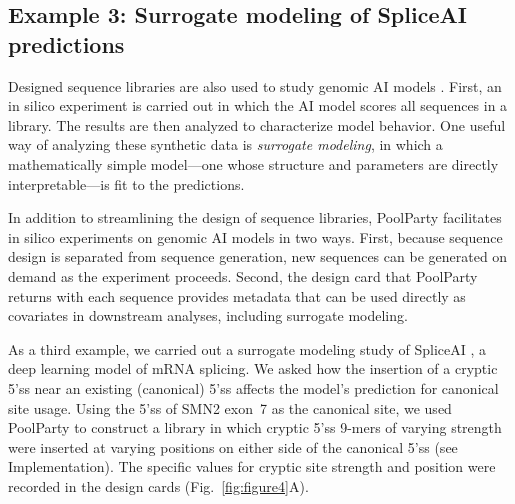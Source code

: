 \documentclass[pdflatex,sn-vancouver-num,referee,lineno,oneside]{sn-jnl}
\begin{document}
\subsection{Example 3: Surrogate modeling of SpliceAI predictions}\label{subsec:example3-spliceai}

Designed sequence libraries are also used to study genomic AI models \citep{Avsec2021bpnet, Toneyan2024creme, Seitz2024squid, Nagai2026review}. First, an in silico experiment is carried out in which the AI model scores all sequences in a library. The results are then analyzed to characterize model behavior. One useful way of analyzing these synthetic data is \emph{surrogate modeling}, in which a mathematically simple model---one whose structure and parameters are directly interpretable---is fit to the predictions.

In addition to streamlining the design of sequence libraries, PoolParty facilitates in silico experiments on genomic AI models in two ways. First, because sequence design is separated from sequence generation, new sequences can be generated on demand as the experiment proceeds. Second, the design card that PoolParty returns with each sequence provides metadata that can be used directly as covariates in downstream analyses, including surrogate modeling.

As a third example, we carried out a surrogate modeling study of SpliceAI \citep{Jaganathan2019ps}, a deep learning model of mRNA splicing. We asked how the insertion of a cryptic 5'ss near an existing (canonical) 5'ss affects the model's prediction for canonical site usage. Using the 5'ss of SMN2 exon~7 as the canonical site, we used PoolParty to construct a library in which cryptic 5'ss 9-mers of varying strength were inserted at varying positions on either side of the canonical 5'ss (see Implementation). The specific values for cryptic site strength and position were recorded in the design cards (Fig.~\ref{fig:figure4}A).
\end{document}
